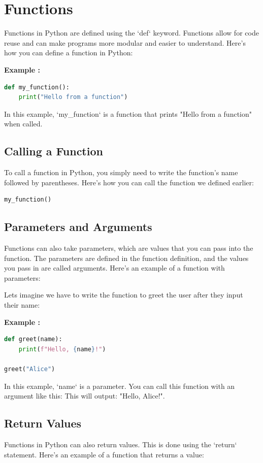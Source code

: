 \documentclass[12pt]{book}
\newtheorem{Example}{Example}[chapter]
\renewenvironment{Example}{\begin{trivlist}\item\relax
\textbf{Example \thesection: }}{\end{trivlist}}
\begin{document}
\newpage
\newpage
\chapter{Functions}

Functions in Python are defined using the `def` keyword. Functions allow for code reuse and can make programs more modular and easier to understand. Here's how you can define a function in Python:
\begin{Example}
\begin{lstlisting}[language=Python]
def my_function():
    print("Hello from a function")
\end{lstlisting}
\end{Example}
In this example, `my\_function` is a function that prints "Hello from a function" when called.


\section{Calling a Function}
To call a function in Python, you simply need to write the function's name followed by parentheses. Here's how you can call the function we defined earlier:
\begin{lstlisting}[language=Python]
my_function()
\end{lstlisting}

\section{Parameters and Arguments}
Functions can also take parameters, which are values that you can pass into the function. The parameters are defined in the function definition, and the values you pass in are called arguments. Here's an example of a function with parameters:

Lets imagine we have to write the function to greet the user after they input their name:
\begin{Example} 
\begin{lstlisting}[language=Python]
def greet(name):
    print(f"Hello, {name}!")
    
greet("Alice")
\end{lstlisting}
\end{Example}

In this example, `name` is a parameter. You can call this function with an argument like this:
This will output: "Hello, Alice!".

\section{Return Values}
Functions in Python can also return values. This is done using the `return` statement. Here's an example of a function that returns a value:
\end{document}
